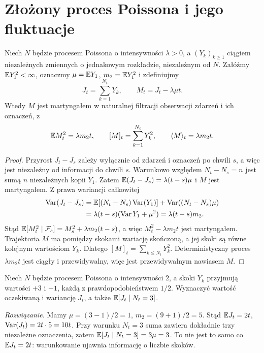 \section{Złożony proces Poissona i jego fluktuacje}
\begin{twierdzenie}
Niech $N$ będzie procesem Poissona o intensywności
$\lambda>0$, a $(Y_k)_{k\ge1}$ ciągiem niezależnych
zmiennych o jednakowym rozkładzie, niezależnym od $N$.
Załóżmy $\mathbb{E} Y_1^2<\infty$, oznaczmy
$\mu=\mathbb{E} Y_1$, $m_2=\mathbb{E} Y_1^2$ i zdefiniujmy
\[
J_t=\sum_{k=1}^{N_t}Y_k,\qquad
M_t=J_t-\lambda\mu t.
\]
Wtedy $M$ jest martyngałem w naturalnej filtracji
obserwacji zdarzeń i ich oznaczeń, z
\[
\mathbb{E} M_t^2=\lambda m_2t,\qquad
[M]_t=\sum_{k=1}^{N_t}Y_k^2,\qquad
\langle M\rangle_t=\lambda m_2t.
\]
\end{twierdzenie}
\begin{proof}
Przyrost $J_t-J_s$ zależy wyłącznie od zdarzeń i oznaczeń
po chwili $s$, a więc jest niezależny od informacji do
chwili $s$. Warunkowo względem $N_t-N_s=n$ jest sumą
$n$ niezależnych kopii $Y_1$. Zatem
$\mathbb{E}(J_t-J_s)=\lambda(t-s)\mu$ i $M$ jest martyngałem.
Z prawa wariancji całkowitej
\[
\begin{aligned}
\operatorname{Var}(J_t-J_s)
&=\mathbb{E}[(N_t-N_s)\operatorname{Var}(Y_1)]
 +\operatorname{Var}((N_t-N_s)\mu)\\
&=\lambda(t-s)(\operatorname{Var} Y_1+\mu^2)
=\lambda(t-s)m_2.
\end{aligned}
\]
Stąd $\mathbb{E}[M_t^2\mid\mathcal{F}_s]
=M_s^2+\lambda m_2(t-s)$, a więc
$M_t^2-\lambda m_2t$ jest martyngałem.
Trajektoria $M$ ma pomiędzy skokami wariację skończoną,
a jej skoki są równe kolejnym wartościom $Y_k$.
Dlatego $[M]_t=\sum_{k\le N_t}Y_k^2$.
Deterministyczny proces $\lambda m_2t$ jest
ciągły i przewidywalny, więc jest przewidywalnym
nawiasem $M$.
\end{proof}

\begin{zadanie}
Niech $N$ będzie procesem Poissona o intensywności $2$,
a skoki $Y_k$ przyjmują wartości $+3$ i $-1$,
każdą z prawdopodobieństwem $1/2$.
Wyznaczyć wartość oczekiwaną i wariancję $J_t$,
a także $\mathbb{E}[J_t\mid N_t=3]$.

\emph{Rozwiązanie.} Mamy
$\mu=(3-1)/2=1$, $m_2=(9+1)/2=5$.
Stąd $\mathbb{E} J_t=2t$, $\operatorname{Var}(J_t)=2t\cdot5=10t$.
Przy warunku $N_t=3$ suma zawiera dokładnie
trzy niezależne oznaczenia, zatem
$\mathbb{E}[J_t\mid N_t=3]=3\mu=3$.
To nie jest to samo co $\mathbb{E} J_t=2t$:
warunkowanie ujawnia informację o liczbie skoków.
\end{zadanie}


